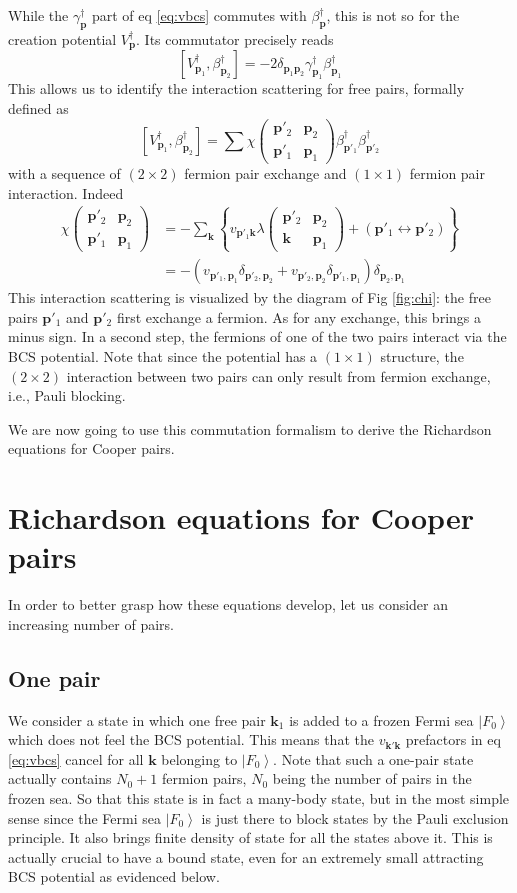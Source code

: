 \documentclass[aps,prb,amsmath,amssymb,superscriptaddress,twocolumn]{revtex4-1}
\newcommand{\vk}{\ensuremath{\mathbf{k}}}
\newcommand{\vp}{\ensuremath{\mathbf{p}}}
\newcommand{\ket}[1]{\ensuremath{\left|#1\right>}}
\newcommand{\br}[1]{\ensuremath{\left(#1\right)}}
\newcommand{\mbr}[1]{\ensuremath{\left[#1\right]}}
\newcommand{\bbr}[1]{\ensuremath{\left\{#1\right\}}}
\newcommand{\fmtrx}[4]{\ensuremath{\br{\begin{smallmatrix}#1&#2\\#3&#4\end{smallmatrix}}}}
\newcommand{\com}[2]{\ensuremath{\mbr{#1,#2}}}
\begin{document}
While the $\gamma^{\dagger}_\vp$ part of eq \eqref{eq:vbcs} commutes with $\beta^{\dagger}_\vp$, this is not so for the creation potential $V^{\dagger}_\vp$.  Its commutator precisely reads
\begin{equation}\label{eq:vpotbeta}
\com{V^{\dagger}_{\vp_1}}{\beta^{\dagger}_{\vp_2}}=-2\delta_{\vp_1\vp_2}\gamma^{\dagger}_{\vp_1}\beta^{\dagger}_{\vp_1}
\end{equation}
This allows us to identify the interaction scattering for free pairs, formally defined as 
\begin{equation}\label{eq:vBeta}
\com{V^{\dagger}_{\vp_1}}{\beta^{\dagger}_{\vp_2}}=\sum\chi\fmtrx{\vp'_2}{\vp_2}{\vp'_1}{\vp_1}\beta^{\dagger}_{\vp'_1}\beta^{\dagger}_{\vp'_2}
\end{equation}
with a sequence of $(2\times2)$ fermion pair exchange and $(1\times1)$ fermion pair interaction. Indeed
\begin{equation}\label{eq:interactSc}
\begin{split}
\chi\fmtrx{\vp'_2}{\vp_2}{\vp'_1}{\vp_1}&=-\sum_\vk\bbr{v_{\vp'_1\vk}\lambda\fmtrx{\vp'_2}{\vp_2}{\vk}{\vp_1}+\br{\vp'_1\leftrightarrow\vp'_2}}\\
&=-\br{v_{\vp'_1,\vp_1}\delta_{\vp'_2,\vp_2}+v_{\vp'_2,\vp_2}\delta_{\vp'_1,\vp_1}}\delta_{\vp_2,\vp_1}
\end{split}
\end{equation}
This interaction scattering is visualized by  the diagram of Fig \ref{fig:chi}: the  free pairs $\vp'_1$ and $\vp'_2$ first exchange a fermion. As for any exchange, this brings a minus sign.  In a second step, the fermions of one of the two pairs interact via the BCS potential.  Note that since the potential has a $(1\times1)$ structure, the $(2\times2)$ interaction between two pairs can only result from fermion exchange, i.e., Pauli blocking. 

We are now going to use this commutation formalism to derive the Richardson equations for Cooper pairs. 

\section{Richardson equations for Cooper pairs\label{sec:rich}}
In order to better grasp how these equations develop, let us  consider an increasing number of pairs. 
\subsection{One pair}
We consider a state in which one free pair $\vk_1$ is added to a frozen Fermi sea $\ket{F_0}$ which does not feel the BCS potential.  This means that the $v_{\vk'\vk}$ prefactors in eq \eqref{eq:vbcs} cancel for all $\vk$ belonging to $\ket{F_0}$.  Note that such a one-pair state actually contains $N_0+1$ fermion pairs, $N_0$ being the number of pairs in the frozen sea.  So that this state is in fact a many-body state, but in the most simple sense since the Fermi sea $\ket{F_0}$ is just there to block states by the Pauli exclusion principle.  It also  brings finite density of state for all the states above it. This is actually crucial to have a bound state, even for an extremely small attracting BCS potential as evidenced below. 
\end{document}
